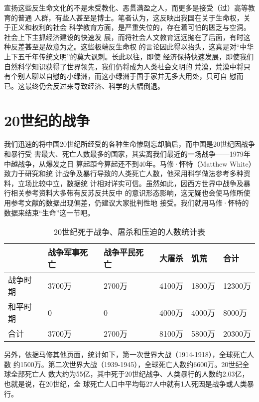 宣扬这些反生命文化的不是未受教化、恶贯满盈之人，而更多是接受（过）高等教育的普通
人群，有些人甚至是博士。笔者认为，这反映出我国在关于生命权，关于正义和权利的社会
科学教育方面，是严重失位的，存在着可怕的匮乏与空洞。社会上下主抓经济建设的快速发
展，而将社会人文教育远远抛在了后面，有时这种反差甚至是故意为之。这些极端反生命权
的言论因此得以抬头，这真是对“中华上下五千年传统文明”的莫大讽刺。长此以往，即使
经济保持快速发展，即使我们自然科学知识获得了世界领先，我们仍将成为人类社会文明的
荒漠，荒漠中将只有个别人聊以自慰的小绿洲，而这小绿洲于国于家并无多大用处，只可自
慰而已。这最终仍会反过来导致经济、科学的大幅倒退。

\section{20世纪的战争}

我们迅速的将中国20世纪所经受的各种生命惨剧忘却脑后，而中国是20世纪因战争和暴行受
害最大、死亡人数最多的国家，其实离我们最近的一场战争——1979年中越战争，从爆发之日
算起距今算起还不到40年。马修·怀特（Matthew White）\cite{mattwhite}致力于研究和统
计战争及暴行导致的人类死亡人数，他采用科学做法参考多种资料，立场比较中立，数据统
计相对详实可信。虽然如此，因西方世界中战争及暴行相关参考资料大多带有反苏反共反中
的意识形态影响，这无疑也会使马修所使用参考文献的数据出现偏差，仍建议大家批判性地
接受。我们就用马修·怀特的数据来结束“生命”这一节吧。

\begin{table}[h]
  \centering
  \caption{20世纪死于战争、屠杀和压迫的人数统计表}
  \label{20stdied}
  \medskip
  \begin{tabular}{@{}llllll@{}}
    \toprule
    & 战争军事死亡 & 战争平民死亡 & 大屠杀   & 饥荒    & 合计 \\ \midrule
    战争时期        & 3700万  & 2700万  & 4100万 & 1800万 & 12300万      \\
    和平时期        & 0      & 0      & 4000万 & 4000万 & 8000万       \\ 
    合计         & 3700万  & 2700万  & 8100万 & 5800万 & 20300万      \\ \bottomrule
  \end{tabular}
\end{table}

另外，依据马修其他页面，统计如下，第一次世界大战（1914-1918），全球死亡人数
约1500万。第二次世界大战（1939-1945），全球死亡人数约6600万。20世纪全球全部死亡人
数大约为55亿，其中死于20世纪战争、人类暴行的人数约2.03亿，也就是说，在20世纪，全
球死亡人口中平均每27人中就有1人死因是战争或人类暴行。

